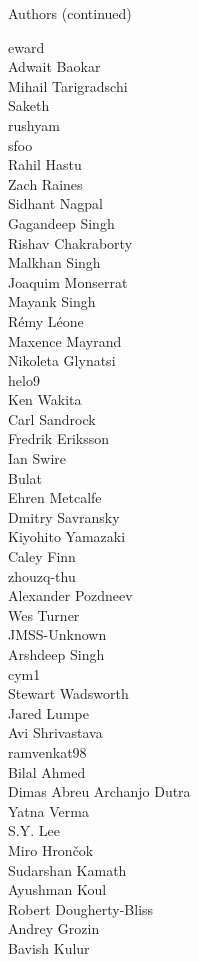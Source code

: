 \begin{frame}{Authors (continued)}
\begin{multicols}{5}
eward\\
Adwait Baokar\\
Mihail Tarigradschi\\
Saketh\\
rushyam\\
sfoo\\
Rahil Hastu\\
Zach Raines\\
Sidhant Nagpal\\
Gagandeep Singh\\
Rishav Chakraborty\\
Malkhan Singh\\
Joaquim Monserrat\\
Mayank Singh\\
Rémy Léone\\
Maxence Mayrand\\
Nikoleta Glynatsi\\
helo9\\
Ken Wakita\\
Carl Sandrock\\
Fredrik Eriksson\\
Ian Swire\\
Bulat\\
Ehren Metcalfe\\
Dmitry Savransky\\
Kiyohito Yamazaki\\
Caley Finn\\
zhouzq-thu\\
Alexander Pozdneev\\
Wes Turner\\
JMSS-Unknown\\
Arshdeep Singh\\
cym1\\
Stewart Wadsworth\\
Jared Lumpe\\
Avi Shrivastava\\
ramvenkat98\\
Bilal Ahmed\\
Dimas Abreu Archanjo Dutra\\
Yatna Verma\\
S.Y. Lee\\
Miro Hrončok\\
Sudarshan Kamath\\
Ayushman Koul\\
Robert Dougherty-Bliss\\
Andrey Grozin\\
Bavish Kulur\\
\end{multicols}
\end{frame}
